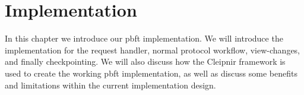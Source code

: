 \chapter{Implementation}

\label{chapter:Imp}


In this chapter we introduce our \ac{pbft} implementation. We will introduce the implementation for the request handler, normal protocol workflow, view-changes, and finally checkpointing. We will also discuss how the Cleipnir framework is used to create the working \ac{pbft} implementation, as well as discuss some benefits and limitations within the current implementation design.

